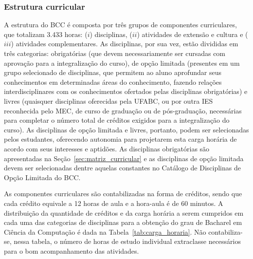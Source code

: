 \subsubsection{Estrutura curricular}

A estrutura do BCC é composta por três grupos de componentes curriculares, que
totalizam 3.433 horas: ($i$) disciplinas, ($ii$) atividades de extensão e
cultura e ($iii$) atividades complementares.
As disciplinas, por sua vez, estão divididas em três categorias: obrigatórias
(que devem necessariamente ser cursadas com aprovação para a integralização do
curso), de opção limitada (presentes em um grupo selecionado de disciplinas,
que permitem ao aluno aprofundar seus conhecimentos em determinadas áreas do
conhecimento, fazendo relações interdisciplinares com os conhecimentos
ofertados pelas disciplinas obrigatórias) e livres (quaisquer disciplinas
oferecidas pela UFABC, ou por outra IES reconhecida pelo MEC, de curso de
graduação ou de pós-graduação, necessárias para completar o número total de
créditos exigidos para a integralização do curso).
As disciplinas de opção limitada e livres, portanto, podem ser selecionadas
pelos estudantes, oferecendo autonomia para projetarem esta carga horária de
acordo com seus interesses e aptidões.
As disciplinas obrigatórias são apresentadas na
Seção~\ref{sec:matriz_curricular} e as disciplinas de opção limitada devem ser
selecionadas dentre aquelas constantes no Catálogo de Disciplinas de Opção
Limitada do BCC.

As componentes curriculares são contabilizadas na forma de créditos, sendo que
cada crédito equivale a 12 horas de aula e a hora-aula é de 60 minutos.
A distribuição da quantidade de créditos e da carga horária a serem cumpridos
em cada uma das categorias de disciplinas para a obtenção do grau de Bacharel
em Ciência da Computação é dada na Tabela~\ref{tab:carga_horaria}.
Não contabiliza-se, nessa tabela, o número de horas de estudo individual
extraclasse necessários para o bom acompanhamento das atividades.

